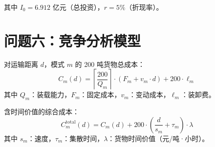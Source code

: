 \documentclass[12pt,a4paper,fontset=none]{ctexart}
\begin{document}
其中 $I_0 = 6.912$ 亿元（总投资），$r=5\%$（折现率）。

\section*{问题六：竞争分析模型}

对运输距离 $d$，模式 $m$ 的 200 吨货物总成本：
\begin{equation}
C_m(d) = \left\lceil\frac{200}{Q_m}\right\rceil \cdot (F_m + v_m \cdot d) + 200 \cdot \ell_m
\end{equation}
其中 $Q_m$：装载能力，$F_m$：固定成本，$v_m$：变动成本，$\ell_m$：装卸费。

含时间价值的综合成本：
\begin{equation}
C_m^{\text{total}}(d) = C_m(d) + 200 \cdot \left(\frac{d}{s_m} + \tau_m\right) \cdot \lambda
\end{equation}
其中 $s_m$：速度，$\tau_m$：集散时间，$\lambda$：货物时间价值（元/吨·小时）。
\end{document}
